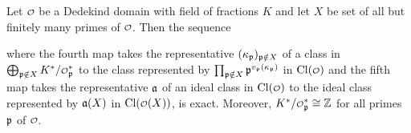      \begin{proposition}\label{prop:ideal_class_group_localization_exact_sequence}
      Let $\smc{O}$ be a Dedekind domain with field of fractions $K$ and let $X$ be set of all but finitely many primes of $\smc{O}$. Then the sequence

      \begin{center}
      \end{center}

      where the fourth map takes the representative $(\kappa_{\mathfrak{p}})_{\mathfrak{p} \notin X}$ of a class in $\bigoplus_{\mf{p} \notin X}K^{\ast}/\smc{O}_{\mf{p}}^{\ast}$ to the class represented by $\prod_{\mathfrak{p} \notin X}\mathfrak{p}^{v_{\mathfrak{p}}(\kappa_{\mathfrak{p}})}$ in $\Cl(\smc{O})$ and the fifth map takes the representative $\mathfrak{a}$ of an ideal class in $\Cl(\smc{O})$ to the ideal class represented by $\mathfrak{a}(X)$ in $\Cl(\smc{O}(X))$, is exact. Moreover, $K^{\ast}/\smc{O}_{\mf{p}}^{\ast} \cong \Z$ for all primes $\mathfrak{p}$ of $\smc{O}$.
    \end{proposition}
